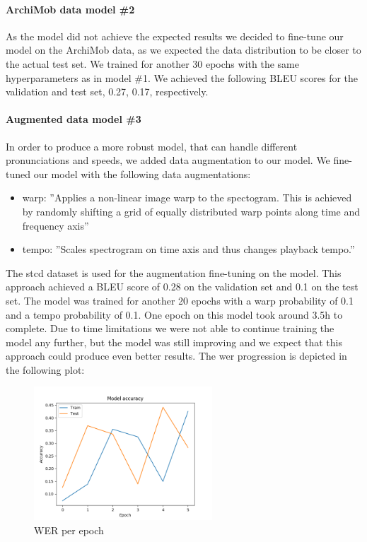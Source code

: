 \paragraph{ArchiMob data model \#2} As the  model did not achieve the expected results we decided to fine-tune our model on the ArchiMob data, as we expected the data distribution to be closer
to the actual test set. We trained for another 30 epochs with the same hyperparameters as in model \#1. We achieved the following BLEU scores for the validation and test set, 0.27, 0.17,
respectively.
\paragraph{Augmented data model \#3} In order to produce a more robust model, that can handle different pronunciations and speeds, we added data augmentation to our  model. We fine-tuned our
model with the following data augmentations:
\begin{itemize}
    \item warp: ''Applies a non-linear image warp to the spectogram. This is achieved by randomly shifting a grid of equally distributed warp points along time and frequency axis''
    \cite{DeepSpeechAugmentation}
    \item tempo: ''Scales spectrogram on time axis and thus changes playback tempo.'' \cite{DeepSpeechAugmentation}
\end{itemize}

The \gls{stcd} dataset is used for the augmentation fine-tuning on the  model. This approach achieved a BLEU score of 0.28 on the validation set and 0.1 on the test set. The model was trained for another
20 epochs with a warp probability of 0.1 and a tempo probability of 0.1. One epoch on this model took around 3.5h to complete. Due to time limitations we
were not able to continue training the model any further, but the model was still improving and we expect that this approach could produce even better results. The \gls{wer} progression is depicted in the following plot:
\begin{figure}[H]
    \includegraphics[width=\linewidth,height=5cm]{img/werPlot.png}
    \caption{WER per epoch}
    \label{fig:werPerEpoch}
\end{figure}

